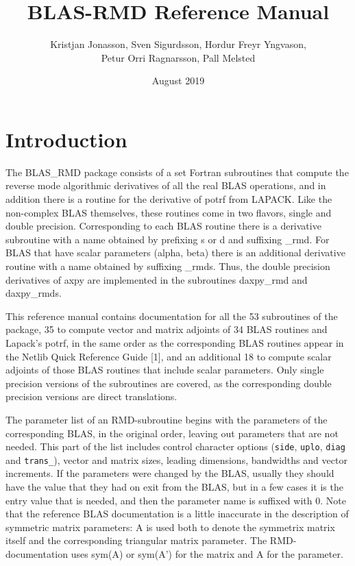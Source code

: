 \documentclass[a4paper]{article}
\title{BLAS-RMD Reference Manual}
\date{August 2019}
\author{Kristjan Jonasson, Sven Sigurdsson, Hordur Freyr Yngvason,\\
  Petur Orri Ragnarsson, Pall Melsted}
\begin{document}
\maketitle

\tableofcontents

\vspace{3cm}

\section{Introduction}

The BLAS\_RMD package consists of a set Fortran subroutines that compute the
reverse mode algorithmic derivatives of all the real BLAS operations, and in
addition there is a routine for the derivative of potrf from LAPACK. Like the
non-complex BLAS themselves, these routines come in two flavors, single and
double precision. Corresponding to each BLAS routine there is a derivative
subroutine with a name obtained by prefixing s or d and suffixing \_rmd. For
BLAS that have scalar parameters (alpha, beta) there is an additional derivative
routine with a name obtained by suffixing \_rmds. Thus, the double precision
derivatives of axpy are implemented in the subroutines daxpy\_rmd and
daxpy\_rmds.

This reference manual contains documentation for all the 53 subroutines of the
package, 35 to compute vector and matrix adjoints of 34 BLAS routines and
Lapack's potrf, in the same order as the corresponding BLAS routines appear in
the Netlib Quick Reference Guide [1], and an additional 18 to compute scalar
adjoints of those BLAS routines that include scalar parameters. Only single
precision versions of the subroutines are covered, as the corresponding double
precision versions are direct translations.

The parameter list of an RMD-subroutine begins with the parameters of the
corresponding BLAS, in the original order, leaving out parameters that are not
needed. This part of the list includes control character options (\texttt{side},
\texttt{uplo}, \texttt{diag} and \texttt{trans\_}), vector and matrix sizes,
leading dimensions, bandwidths and vector increments. If the parameters were
changed by the BLAS, usually they should have the value that they had on exit
from the BLAS, but in a few cases it is the entry value that is needed, and then
the parameter name is suffixed with 0. Note that the reference BLAS
documentation is a little inaccurate in the description of symmetric matrix
parameters: A is used both to denote the symmetrix matrix itself and the
corresponding triangular matrix parameter. The RMD-documentation uses sym(A) or
sym(A') for the matrix and A for the parameter.
\end{document}
